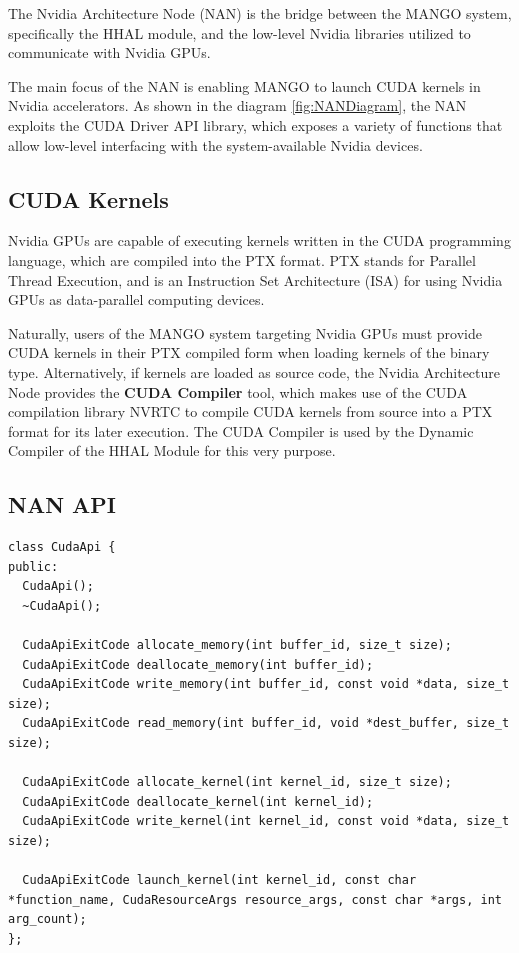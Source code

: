 The Nvidia Architecture Node (NAN) is the bridge between the MANGO system, specifically the HHAL module, and the low-level Nvidia libraries utilized to communicate with Nvidia GPUs.

The main focus of the NAN is enabling MANGO to launch CUDA kernels in Nvidia accelerators. As shown in the diagram \ref{fig:NANDiagram}, the NAN exploits the CUDA Driver API \cite{cuda_driver_api} library, which exposes a variety of functions that allow low-level interfacing with the system-available Nvidia devices.

\subsection{CUDA Kernels} \label{Nvidia:CudaCompiler}

Nvidia GPUs are capable of executing kernels written in the CUDA programming language, which are compiled into the PTX \cite{ptx} format. PTX stands for Parallel Thread Execution, and is an Instruction Set Architecture (ISA) for using Nvidia GPUs as data-parallel computing devices.

Naturally, users of the MANGO system targeting Nvidia GPUs must provide CUDA kernels in their PTX compiled form when loading kernels of the binary type.
Alternatively, if kernels are loaded as source code, the Nvidia Architecture Node provides the \textbf{CUDA Compiler} tool, which makes use of the CUDA compilation library NVRTC \cite{nrvtc} to compile CUDA kernels from source into a PTX format for its later execution. The CUDA Compiler is used by the Dynamic Compiler of the HHAL Module for this very purpose.

\subsection{NAN API}

\begin{lstlisting}[style=CStyle, label=NAN:CudaApi, caption=Nvidia Architecture Manager - CudaApi]
class CudaApi {
public:
  CudaApi();
  ~CudaApi();

  CudaApiExitCode allocate_memory(int buffer_id, size_t size);
  CudaApiExitCode deallocate_memory(int buffer_id);
  CudaApiExitCode write_memory(int buffer_id, const void *data, size_t size);
  CudaApiExitCode read_memory(int buffer_id, void *dest_buffer, size_t size);

  CudaApiExitCode allocate_kernel(int kernel_id, size_t size);
  CudaApiExitCode deallocate_kernel(int kernel_id);
  CudaApiExitCode write_kernel(int kernel_id, const void *data, size_t size);
  
  CudaApiExitCode launch_kernel(int kernel_id, const char *function_name, CudaResourceArgs resource_args, const char *args, int arg_count);
};
\end{lstlisting}

